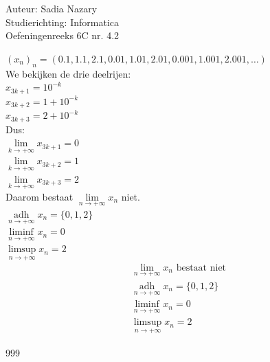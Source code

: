 \documentclass[a4paper]{article}
\begin{document}
\noindent \large Auteur: Sadia Nazary \\
\noindent \large Studierichting: Informatica\\
\noindent \large Oefeningenreeks 6C nr. 4.2\\

\medskip

\normalsize

$\left(x_n\right)_n=
(0.1,1.1,2.1,0.01,1.01,2.01,0.001,1.001,2.001,\ldots)$\\

We bekijken de drie deelrijen:\\

$x_{3k+1}=10^{-k}$\\

$x_{3k+2}=1+10^{-k}$\\

$x_{3k+3}=2+10^{-k}$\\

Dus:\\

$\lim\limits_{k\to+\infty}x_{3k+1}=0$\\

$\lim\limits_{k\to+\infty}x_{3k+2}=1$\\

$\lim\limits_{k\to+\infty}x_{3k+3}=2$\\

Daarom bestaat
$\lim\limits_{n\to+\infty}x_n$
niet.\\

$\operatorname*{adh}\limits_{n\to+\infty}x_n=\{0,1,2\}$\\

$\liminf\limits_{n\to+\infty}x_n=0$\\

$\limsup\limits_{n\to+\infty}x_n=2$\\

\[
\boxed{
\begin{array}{c}
\lim\limits_{n\to+\infty}x_n
\text{ bestaat niet}\\
\operatorname*{adh}\limits_{n\to+\infty}x_n=\{0,1,2\}\\
\liminf\limits_{n\to+\infty}x_n=0\\
\limsup\limits_{n\to+\infty}x_n=2
\end{array}
}
\]

\begin{thebibliography}{999}
\end{thebibliography}
\end{document}
